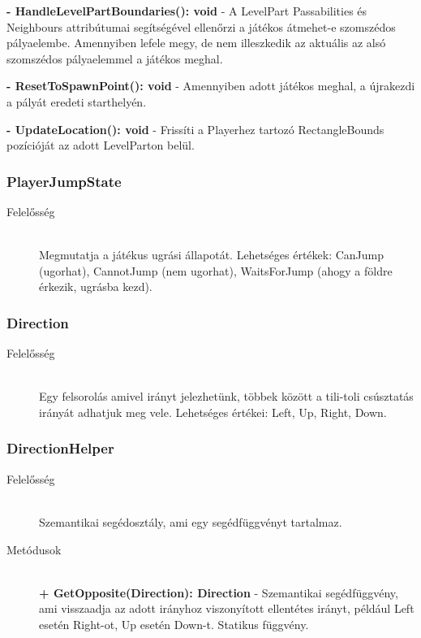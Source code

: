 \begin{description}
		\textbf{- HandleLevelPartBoundaries(): void} - A LevelPart Passabilities és Neighbours attribútumai segítségével ellenőrzi a játékos átmehet-e szomszédos pályaelembe. Amennyiben lefele megy, de nem illeszkedik az aktuális az alsó szomszédos pályaelemmel a játékos meghal.

		\textbf{- ResetToSpawnPoint(): void} - Amennyiben adott játékos meghal, a újrakezdi a pályát eredeti starthelyén.

		\textbf{- UpdateLocation(): void} - Frissíti a Playerhez tartozó RectangleBounds pozícióját az adott LevelParton belül.
						
	\end{description}
	
\subsubsection{PlayerJumpState}
	\begin{description}
		\item[Felelősség] \hfill \\
		Megmutatja a játékus ugrási állapotát. Lehetséges értékek: CanJump (ugorhat), CannotJump (nem ugorhat), WaitsForJump (ahogy a földre érkezik, ugrásba kezd).

	\end{description}
	
\subsubsection{Direction}
	\begin{description}
		\item[Felelősség] \hfill \\
		Egy felsorolás amivel irányt jelezhetünk, többek között a tili-toli csúsztatás irányát adhatjuk meg vele. Lehetséges értékei: Left, Up, Right, Down.

	\end{description}

\subsubsection{DirectionHelper}
	\begin{description}
		\item[Felelősség] \hfill \\
		Szemantikai segédosztály, ami egy segédfüggvényt tartalmaz.

		\item[Metódusok] \hfill \\
		\textbf{+ GetOpposite(Direction): Direction} - Szemantikai segédfüggvény, ami visszaadja az adott irányhoz viszonyított ellentétes irányt, például Left esetén Right-ot, Up esetén Down-t. Statikus függvény.

	\end{description}
	
